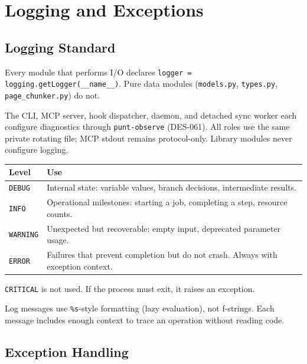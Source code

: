 \documentclass[a4paper,10pt]{article}
\begin{document}
\section{Logging and Exceptions}

\subsection{Logging Standard}

Every module that performs I/O declares
\texttt{logger = logging.getLogger(\_\_name\_\_)}.  Pure data modules
(\texttt{models.py}, \texttt{types.py}, \texttt{page\_chunker.py}) do not.

The CLI, MCP server, hook dispatcher, daemon, and detached sync worker each
configure diagnostics through \texttt{punt-observe} (DES-061).
All roles use the same private rotating file; MCP stdout remains protocol-only.
Library modules never configure logging.

\begin{center}
\begin{tabular}{lp{8cm}}
\toprule
\textbf{Level} & \textbf{Use} \\
\midrule
\texttt{DEBUG}   & Internal state: variable values, branch decisions,
                   intermediate results. \\
\texttt{INFO}    & Operational milestones: starting a job, completing
                   a step, resource counts. \\
\texttt{WARNING} & Unexpected but recoverable: empty input, deprecated
                   parameter usage. \\
\texttt{ERROR}   & Failures that prevent completion but do not crash.
                   Always with exception context. \\
\bottomrule
\end{tabular}
\end{center}

\texttt{CRITICAL} is not used.  If the process must exit, it raises an
exception.

Log messages use \texttt{\%s}-style formatting (lazy evaluation), not
f-strings.  Each message includes enough context to trace an operation
without reading code.

\subsection{Exception Handling}
\end{document}
